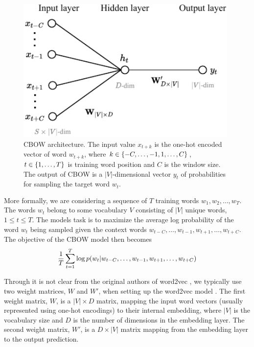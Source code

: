 \begin{figure}[H]
    \centering
    \includegraphics[width=11cm]{thesis/figures/cbow_cropped.pdf}
    \caption{CBOW architecture. The input value $x_{t+k}$ is the one-hot encoded vector of word $w_{t+k}$, where $k \in \left\{-C, \ldots, -1, 1, \ldots, C\right\}$, $t \in \left\{1, \ldots, T\right\}$ is training word position and $C$ is the window size. The output of CBOW is a $|V|$-dimensional vector $y_t$ of probabilities for sampling the target word $w_t$.}
    \label{fig:cbow-model}
\end{figure}

More formally, we are considering a sequence of $T$ training words $w_1, w_2, \ldots, w_T$. The words $w_t$ belong to some vocabulary $V$ consisting of $|V|$ unique words, $1 \leq t \leq T$. The models task is to maximize the average log probability of the word $w_t$ being sampled given the context words $w_{t-C}, \ldots, w_{t-1}, w_{t+1}, \ldots, w_{t+C}$. The objective of the CBOW model then becomes
\begin{align}
    \frac{1}{T} \sum\limits_{t=1}^{T} \log p(w_t | w_{t-C}, \ldots, w_{t-1}, w_{t+1}, \ldots, w_{t+C})
    \label{eqn:cbow-objective-function}
\end{align}

Through it is not clear from the original authors of word2vec \cite{mikolov2013a, mikolov2013b}, we typically use two weight matrices, $W$ and $W'$, when setting up the word2vec model \cite{rong2016word2vec}. The first weight matrix, $W$, is a $|V| \times D$ matrix, mapping the input word vectors (usually represented using one-hot encodings) to their internal embedding, where $|V|$ is the vocabulary size and $D$ is the number of dimensions in the embedding layer. The second weight matrix, $W'$, is a $D \times |V|$ matrix mapping from the embedding layer to the output prediction.

